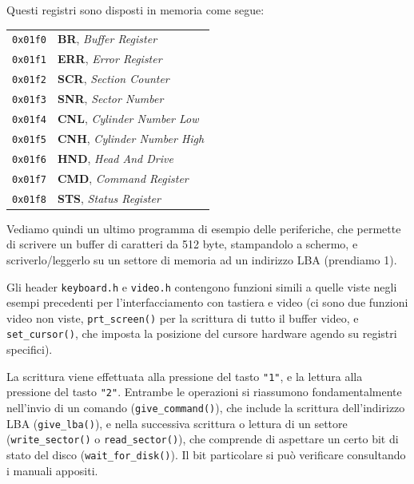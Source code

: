 \documentclass[a4paper,11pt]{article}
\begin{document}
Questi registri sono disposti in memoria come segue:
\begin{table}[h!]
	\center 
	\begin{tabular} { c | p{7cm} }
		\lstinline|0x01f0| & \textbf{BR}, \textit{Buffer Register} \\
		\lstinline|0x01f1| & \textbf{ERR}, \textit{Error Register} \\
		\lstinline|0x01f2| & \textbf{SCR}, \textit{Section Counter} \\
		\hline
		\lstinline|0x01f3| & \textbf{SNR}, \textit{Sector Number} \\
		\lstinline|0x01f4| & \textbf{CNL}, \textit{Cylinder Number Low} \\
		\lstinline|0x01f5| & \textbf{CNH}, \textit{Cylinder Number High} \\
		\lstinline|0x01f6| & \textbf{HND}, \textit{Head And Drive} \\
		\hline
		\lstinline|0x01f7| & \textbf{CMD}, \textit{Command Register} \\
		\lstinline|0x01f8| & \textbf{STS}, \textit{Status Register} \\
	\end{tabular}
\end{table}

\par\smallskip

Vediamo quindi un ultimo programma di esempio delle periferiche, che permette di scrivere un buffer di caratteri da 512 byte, stampandolo a schermo, e scriverlo/leggerlo su un settore di memoria ad un indirizzo LBA (prendiamo 1).

\lstset{style=codestyle, language=C++}


Gli header \lstinline|keyboard.h| e \lstinline|video.h| contengono funzioni simili a quelle viste negli esempi precedenti per l'interfacciamento con tastiera e video (ci sono due funzioni video non viste, \lstinline|prt_screen()| per la scrittura di tutto il buffer video, e \lstinline|set_cursor()|, che imposta la posizione del cursore hardware agendo su registri specifici).

La scrittura viene effettuata alla pressione del tasto \lstinline|"1"|, e la lettura alla pressione del tasto \lstinline|"2"|.
Entrambe le operazioni si riassumono fondamentalmente nell'invio di un comando (\lstinline|give_command()|), che include la scrittura dell'indirizzo LBA (\lstinline|give_lba()|), e nella successiva scrittura o lettura di un settore (\lstinline|write_sector()| o \lstinline|read_sector()|), che comprende di aspettare un certo bit di stato del disco (\lstinline|wait_for_disk()|).
Il bit particolare si può verificare consultando i manuali appositi.
\end{document}
